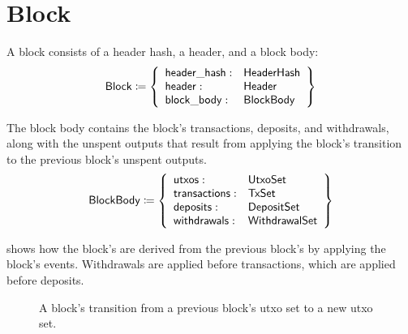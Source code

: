\documentclass[../midgard.tex]{subfiles}
\begin{document}
\section{Block}
\label{h:block}

A block consists of a header hash, a header, and a block body:
\begin{equation*}
    \mathsf{Block} \coloneq \left\{
    \begin{array}{ll}
        \mathsf{header\_hash} : & \mathsf{HeaderHash} \\
        \mathsf{header} : & \mathsf{Header} \\
        \mathsf{block\_body} : & \mathsf{BlockBody}
    \end{array} \right\}
\end{equation*}

The block body contains the block's transactions, deposits, and withdrawals, along with
the unspent outputs that result from applying the block's transition to the previous block's unspent outputs.
\begin{equation*}
    \mathsf{BlockBody} \coloneq \left\{
    \begin{array}{ll}
        \mathsf{utxos} : & \mathsf{UtxoSet} \\
        \mathsf{transactions} : & \mathsf{TxSet} \\
        \mathsf{deposits} : & \mathsf{DepositSet} \\
        \mathsf{withdrawals} : & \mathsf{WithdrawalSet} \\
    \end{array} \right\}
\end{equation*}

 shows how the block's  are derived from the previous block's  by applying the block's events.
Withdrawals are applied before transactions, which are applied before deposits.

\begin{figure}[htb] %
    \centering %
    \caption{A block's transition from a previous block's utxo set to a new utxo set.}
    \label{fig:block-transition}
\end{figure}
\end{document}
